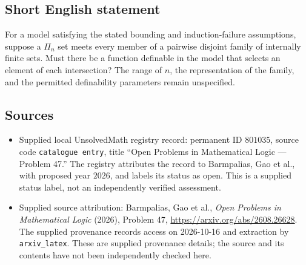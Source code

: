 \documentclass[11pt]{article}
\begin{document}
\subsection{Short English statement}
For a model satisfying the stated bounding and induction-failure assumptions, suppose a \(\Pi_n\) set meets every member of a pairwise disjoint family of internally finite sets. Must there be a function definable in the model that selects an element of each intersection? The range of \(n\), the representation of the family, and the permitted definability parameters remain unspecified.
\subsection{Sources}
\begin{itemize}
\item Supplied local UnsolvedMath registry record: permanent ID \(801035\), source code \texttt{catalogue entry}, title ``Open Problems in Mathematical Logic --- Problem 47.'' The registry attributes the record to Barmpalias, Gao et al., with proposed year \(2026\), and labels its status as open. This is a supplied status label, not an independently verified assessment.
\item Supplied source attribution: Barmpalias, Gao et al., \emph{Open Problems in Mathematical Logic} (2026), Problem 47, \url{https://arxiv.org/abs/2608.26628}. The supplied provenance records access on 2026-10-16 and extraction by \texttt{arxiv\_latex}. These are supplied provenance details; the source and its contents have not been independently checked here.
\end{itemize}
\end{document}
